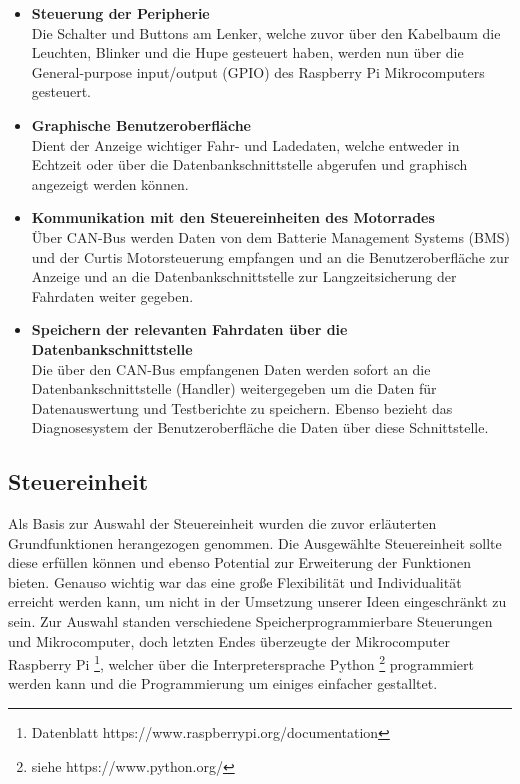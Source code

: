 \begin{itemize}

	\item \textbf{Steuerung der Peripherie} \medskip\\
	Die Schalter und Buttons am Lenker, welche zuvor über den Kabelbaum die Leuchten, Blinker und die Hupe gesteuert haben, werden nun über die General-purpose input/output (GPIO) des Raspberry Pi Mikrocomputers gesteuert.

	\item \textbf{Graphische Benutzeroberfläche}\medskip\\
Dient der Anzeige wichtiger Fahr- und Ladedaten, welche entweder in Echtzeit oder über die Datenbankschnittstelle abgerufen und graphisch angezeigt werden können.

	\item \textbf{Kommunikation mit den Steuereinheiten des Motorrades} \medskip\\
	Über CAN-Bus werden Daten von dem Batterie Management Systems (BMS) und der Curtis Motorsteuerung empfangen und an die Benutzeroberfläche zur Anzeige und an die Datenbankschnittstelle zur Langzeitsicherung der Fahrdaten weiter gegeben.

	\item \textbf{Speichern der relevanten Fahrdaten über die Datenbankschnittstelle} \medskip\\
Die über den CAN-Bus empfangenen Daten werden sofort an die Datenbankschnittstelle (Handler) weitergegeben um die Daten für Datenauswertung und Testberichte zu speichern. Ebenso bezieht das Diagnosesystem der Benutzeroberfläche die Daten über diese Schnittstelle.

\end{itemize}

\newpage

\subsection{Steuereinheit}

Als Basis zur Auswahl der Steuereinheit wurden die zuvor erläuterten Grundfunktionen herangezogen genommen. Die Ausgewählte Steuereinheit sollte diese erfüllen können und ebenso Potential zur Erweiterung der Funktionen bieten. Genauso wichtig war das eine große Flexibilität und Individualität erreicht werden kann, um nicht in der Umsetzung unserer Ideen eingeschränkt zu sein. Zur Auswahl standen verschiedene Speicherprogrammierbare Steuerungen und Mikrocomputer, doch letzten Endes überzeugte der Mikrocomputer Raspberry Pi \footnote{Datenblatt https://www.raspberrypi.org/documentation}, welcher über die Interpretersprache Python \footnote{siehe https://www.python.org/} programmiert werden kann und die Programmierung um einiges einfacher gestalltet.

